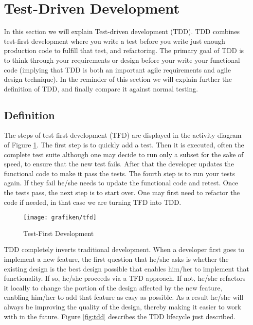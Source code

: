 \section{Test-Driven Development}
\label{sec:tdd}
In this section we will explain Test-driven development (TDD). TDD combines test-first development where you write a test before you write just enough production code to fulfill that test, and refactoring. The primary goal of TDD is to think through your requirements or design before your write your functional code (implying that TDD is both an important agile requirements and agile design technique)\cite{Martin2002}. In the reminder of this section we will explain further the definition of TDD, and finally compare it against normal testing.

\subsection{Definition}
The steps of test-first development (TFD) are displayed in the activity diagram of Figure \ref{fig:tfd}. The first step is to quickly add a test. Then it is executed, often the complete test suite although one may decide to run only a subset for the sake of speed, to ensure that the new test fails. After that the developer updates the functional code to make it pass the tests. The fourth step is to run your tests again. If they fail he/she needs to update the functional code and retest. Once the tests pass, the next step is to start over. One may first need to refactor the code if needed, in that case we are turning TFD into TDD.

\begin{figure}[H]
	\centering
    \texttt{[image: grafiken/tfd]}
    \caption{Test-First Development}
    \label{fig:tfd}
\end{figure}

TDD completely inverts traditional development. When a developer first goes to implement a new feature, the first question that he/she asks is whether the existing design is the best design possible that enables him/her to implement that functionality. If so, he/she proceeds via a TFD approach. If not, he/she refactors it locally to change the portion of the design affected by the new feature, enabling him/her to add that feature as easy as possible. As a result he/she will always be improving the quality of the design, thereby making it easier to work with in the future. Figure \ref{fig:tdd} describes the TDD lifecycle just described.

